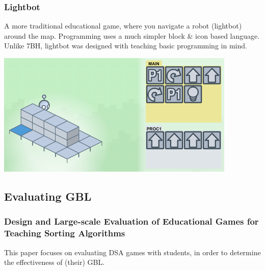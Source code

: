 \documentclass{beamer}
\begin{document}
\begin{frame}
  \frametitle{Lightbot}
  A more traditional educational game, where you navigate a robot (lightbot) around the map. Programming uses a much simpler block \& icon based language. Unlike 7BH, lightbot was designed with teaching basic programming in mind.
\end{frame}
\begin{frame}
  \begin{center}
    \includegraphics[width=\textwidth,height=\textheight,keepaspectratio]{lbot.png}
  \end{center}
\end{frame}
\subsection{Evaluating GBL}
\begin{frame}
  \frametitle{Design and Large-scale Evaluation of Educational Games for Teaching Sorting Algorithms
  }
  This paper focuses on evaluating DSA games with students, in order to determine the effectiveness of (their) GBL.
  

\end{frame}
\end{document}
